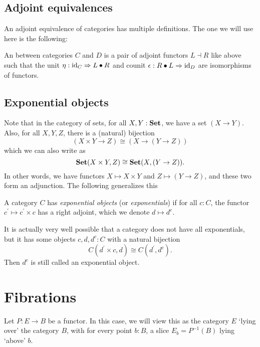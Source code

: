 \subsection{Adjoint equivalences}
An adjoint equivalence of categories has multiple definitions. The one we will use here is the following:

\begin{definition}
  An  between categories $ C $ and $ D $ is a pair of adjoint functors $ L \dashv R $ like above such that the unit $ \eta: \text{id}_{C} \Rightarrow L \bullet R $ and counit $ \epsilon: R \bullet L \Rightarrow \text{id}_{D} $ are isomorphisms of functors.
\end{definition}

\subsection{Exponential objects}
Note that in the category of sets, for all $ X, Y: \mathbf{Set} $, we have a set $ (X \to Y) $. Also, for all $ X, Y, Z $, there is a (natural) bijection
\[ (X \times Y \to Z) \cong (X \to (Y \to Z)) \]
which we can also write as
\[ \mathbf{Set}(X \times Y, Z) \cong \mathbf{Set}(X, (Y \to Z)). \]
In other words, we have functors $ X \mapsto X \times Y $ and $ Z \mapsto (Y \to Z) $, and these two form an adjunction. The following generalizes this
\begin{definition}
  A category $ C $ has \textit{exponential objects} (or \textit{exponentials}) if for all $ c: C $, the functor $ c^\prime \mapsto c^\prime \times c $ has a right adjoint, which we denote $ d \mapsto d^c $.
\end{definition}

\begin{remark}
  It is actually very well possible that a category does not have all exponentials, but it has some objects $ c, d, d^c: C $ with a natural bijection
  \[ C(d^\prime \times c, d) \cong C(d^\prime, d^c). \]
  Then $ d^c $ is still called an exponential object.
\end{remark}

\section{Fibrations}
Let $ P : E \to B $ be a functor. In this case, we will view this as the category $ E $ `lying over' the category $ B $, with for every point $ b: B $, a slice $ E_b = P^{-1}(B) $ lying `above' $ b $.

